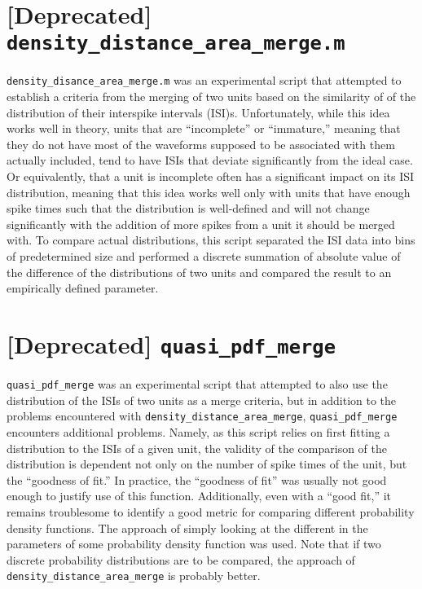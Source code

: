 \documentclass{article}
\begin{document}
\section{[Deprecated] \texttt{density\_distance\_area\_merge.m}}
\texttt{density\_disance\_area\_merge.m} was an experimental script
that attempted to establish a criteria from the merging of two units
based on the similarity of of the distribution of their interspike
intervals (ISI)s. 
Unfortunately, while this idea works well in theory, units that are
``incomplete'' or ``immature,'' meaning that they do not have most of
the waveforms supposed to be associated with them actually included,
tend to have ISIs that deviate significantly from the ideal case. Or
equivalently, that a unit is incomplete often has a significant impact
on its ISI distribution, meaning that this idea works well only with
units that have enough spike times such that the distribution is
well-defined and will not change significantly with the addition of more
spikes from a unit it should be merged with. To compare actual
distributions, this script separated the ISI data into bins of
predetermined size and performed a discrete summation of absolute value
of the difference of the distributions of two units and compared the
result to an empirically defined parameter.

\section{[Deprecated] \texttt{quasi\_pdf\_merge}}
\texttt{quasi\_pdf\_merge} was an experimental script that attempted to
also use the distribution of the ISIs of two units as a merge criteria,
but in addition to the problems encountered with
\texttt{density\_distance\_area\_merge}, \texttt{quasi\_pdf\_merge}
encounters additional problems. Namely, as this script relies on first
fitting a distribution to the ISIs of a given unit, the validity of the
comparison of the distribution is dependent not only on the number of
spike times of the unit, but the ``goodness of fit.'' In practice, the
``goodness of fit'' was usually not good enough to justify use of this
function. Additionally, even with a ``good fit,'' it remains troublesome
to identify a good metric for comparing different probability density
functions. The approach of simply looking at the different in the
parameters of some probability density function was used. Note that if
two discrete probability distributions are to be compared, the approach
of \texttt{density\_distance\_area\_merge} is probably better.
\end{document}
